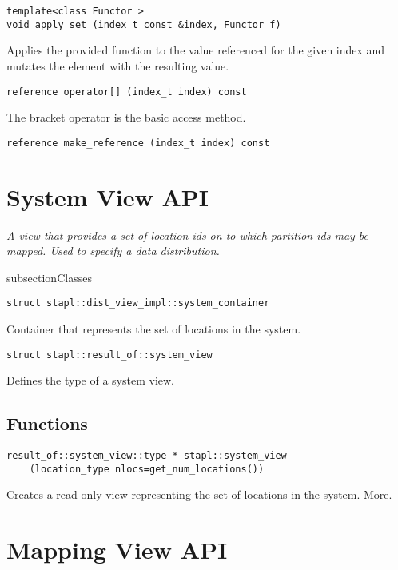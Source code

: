 \begin{verbatim}
template<class Functor >
void apply_set (index_t const &index, Functor f)
\end{verbatim}

Applies the provided function to the value referenced for the given index and mutates the element with the resulting value.

\begin{verbatim}
reference operator[] (index_t index) const
\end{verbatim}

The bracket operator is the basic access method.

\begin{verbatim}
reference make_reference (index_t index) const
\end{verbatim}

\pagebreak

\section{System View API} \label{sec-dist-sys-vw}

\emph{A view that provides a set of location ids on to which partition ids may be mapped.  Used to specify a data distribution. }

subsection{Classes}

\begin{verbatim}
struct stapl::dist_view_impl::system_container
\end{verbatim}

Container that represents the set of locations in the system.

\begin{verbatim}
struct stapl::result_of::system_view
\end{verbatim}

Defines the type of a system view.

\subsection{Functions}

\begin{verbatim}
result_of::system_view::type * stapl::system_view
    (location_type nlocs=get_num_locations())
\end{verbatim}

Creates a read-only view representing the set of locations in the system. More.

\section{Mapping View API} \label{sec-dist-map-vw}

